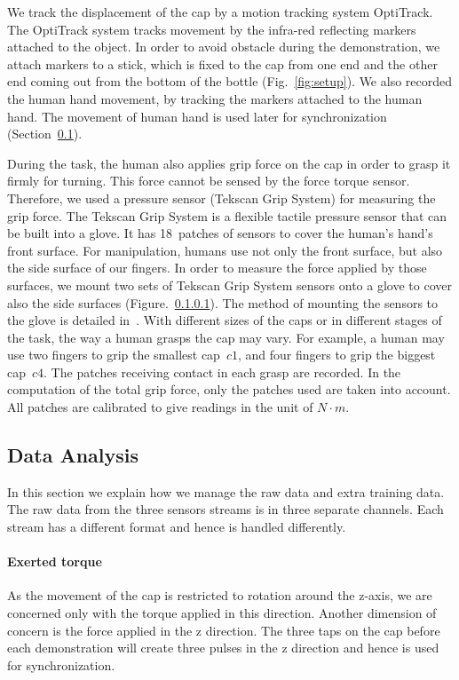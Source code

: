 We track the displacement of the cap by a motion tracking system OptiTrack. The OptiTrack system tracks movement by the infra-red reflecting markers attached to the object. In order to avoid obstacle during the demonstration, we attach markers to a stick, which is fixed to the cap from one end and the other end coming out from the bottom of the bottle (Fig.~\ref{fig:setup}). We also recorded the human hand movement, by tracking the markers attached to the human hand. The movement of human hand is used later for synchronization (Section~\ref{cha4:sec3:dataanalysis}).

During the task, the human also applies grip force on the cap in order
to grasp it firmly for turning. This force cannot be sensed by the
force torque sensor. Therefore, we used a pressure sensor (Tekscan
Grip System) for measuring the grip force. The Tekscan Grip System is
a flexible tactile pressure sensor that can be built into a glove. It
has 18~patches of sensors to cover the human's hand's front
surface. For manipulation, humans use not only the front surface, but
also the side surface of our fingers. In order to measure the force
applied by those surfaces, we mount two sets of Tekscan Grip System
sensors onto a glove to cover also the side surfaces
(Figure.~\ref{ftsensor}). The method of mounting the sensors to the glove
is detailed in~\citep{deSouza2014}. With different sizes of the caps
or in different stages of the task, the way a human grasps the cap may
vary.  For example, a human may use two fingers to grip the smallest
cap~$c1$, and four fingers to grip the biggest cap~$c4$. The patches
receiving contact in each grasp are recorded. In the computation of
the total grip force, only the patches used are taken into
account. All patches are calibrated to give readings in the unit of
$N{\cdot}m$.


\subsection{Data Analysis}
\label{cha4:sec3:dataanalysis}
In this section we explain how we manage the raw data and extra
training data.  The raw data from the three sensors streams is in
three separate channels. Each stream has a different format and hence
is handled differently.


\paragraph{\textbf{Exerted torque}}
\label{ftsensor}
As the movement of the cap is restricted to rotation around the
z-axis, we are concerned only with the torque applied in this direction.
Another dimension of concern is the force applied in the z direction. The
three taps on the cap before each demonstration will create three
pulses in the z direction and hence is used for synchronization.


